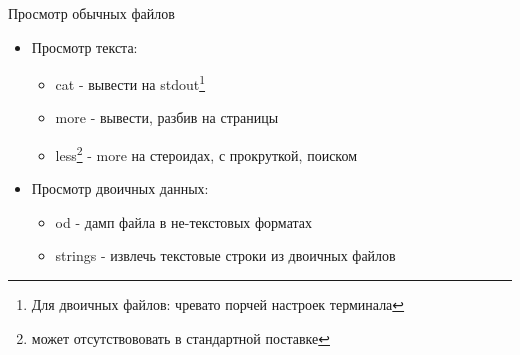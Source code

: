 
\begin{frame}{Просмотр обычных файлов}
  \begin{itemize}
    \item Просмотр текста:
      \begin{itemize} 
	\item \alert{cat} - вывести на stdout\footnote{Для двоичных файлов: чревато порчей настроек терминала} \pause
	\item \alert{more} - вывести, разбив на страницы
	\item \alert{less}\footnote{может отсутствововать в стандартной поставке} - \alert{more} на стероидах, с прокруткой, поиском 
      \end{itemize} \pause
    \item Просмотр двоичных данных:
      \begin{itemize} 
	\item \alert{od} - дамп файла в не-текстовых форматах

        \item \alert{strings} - извлечь текстовые строки из двоичных файлов
      \end{itemize}
  \end{itemize}

\end{frame}
